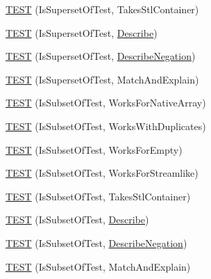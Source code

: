 \begin{DoxyCompactItemize}
\item 
\mbox{\hyperlink{namespacetesting_1_1gmock__matchers__test_a7f20d0da713270b05ac281034db4474d}{T\+E\+ST}} (Is\+Superset\+Of\+Test, Takes\+Stl\+Container)
\item 
\mbox{\hyperlink{namespacetesting_1_1gmock__matchers__test_aa2c2618b90199acf6fbfd744ed4e06e6}{T\+E\+ST}} (Is\+Superset\+Of\+Test, \mbox{\hyperlink{namespacetesting_1_1gmock__matchers__test_a738a538e1705ea49670aeb3ed25108e6}{Describe}})
\item 
\mbox{\hyperlink{namespacetesting_1_1gmock__matchers__test_adaaba3b4b2c1bdecc2cf6b2fda60e48f}{T\+E\+ST}} (Is\+Superset\+Of\+Test, \mbox{\hyperlink{namespacetesting_1_1gmock__matchers__test_a96c18b92dede79060a7303fe5d178faf}{Describe\+Negation}})
\item 
\mbox{\hyperlink{namespacetesting_1_1gmock__matchers__test_aa0e49e413718410f6c218a8cea29efb5}{T\+E\+ST}} (Is\+Superset\+Of\+Test, Match\+And\+Explain)
\item 
\mbox{\hyperlink{namespacetesting_1_1gmock__matchers__test_ae0309b4aaaec67e3efd01102b13c17b7}{T\+E\+ST}} (Is\+Subset\+Of\+Test, Works\+For\+Native\+Array)
\item 
\mbox{\hyperlink{namespacetesting_1_1gmock__matchers__test_a6a37363fe812ad8b04db69879edf19f8}{T\+E\+ST}} (Is\+Subset\+Of\+Test, Works\+With\+Duplicates)
\item 
\mbox{\hyperlink{namespacetesting_1_1gmock__matchers__test_aa2cde172d990e3974d75ee1ccddef589}{T\+E\+ST}} (Is\+Subset\+Of\+Test, Works\+For\+Empty)
\item 
\mbox{\hyperlink{namespacetesting_1_1gmock__matchers__test_a0c74e53d448fba1689bdf80d89306670}{T\+E\+ST}} (Is\+Subset\+Of\+Test, Works\+For\+Streamlike)
\item 
\mbox{\hyperlink{namespacetesting_1_1gmock__matchers__test_aca8044618c61c7d814187623bc204a27}{T\+E\+ST}} (Is\+Subset\+Of\+Test, Takes\+Stl\+Container)
\item 
\mbox{\hyperlink{namespacetesting_1_1gmock__matchers__test_a3fb89037795dbe77c5504d76064cedaf}{T\+E\+ST}} (Is\+Subset\+Of\+Test, \mbox{\hyperlink{namespacetesting_1_1gmock__matchers__test_a738a538e1705ea49670aeb3ed25108e6}{Describe}})
\item 
\mbox{\hyperlink{namespacetesting_1_1gmock__matchers__test_a27188764d3036078c16d2efac0134e0b}{T\+E\+ST}} (Is\+Subset\+Of\+Test, \mbox{\hyperlink{namespacetesting_1_1gmock__matchers__test_a96c18b92dede79060a7303fe5d178faf}{Describe\+Negation}})
\item 
\mbox{\hyperlink{namespacetesting_1_1gmock__matchers__test_a45d11b31944031c232a0de0f47f0538a}{T\+E\+ST}} (Is\+Subset\+Of\+Test, Match\+And\+Explain)

\end{DoxyCompactItemize}
